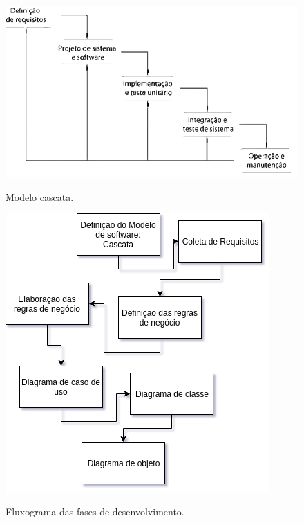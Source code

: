        \begin{figure}[H]
        	\centering
        	\caption{Modelo cascata.}	
        	\includegraphics[width=\linewidth, frame]{Imagens/cascata}
        	\label{fig:cascata}
        \end{figure}
        
        \begin{figure}[H]
        	\centering
        	\caption{Fluxograma das fases de desenvolvimento.}	
        	\includegraphics[width=\linewidth, frame]{Imagens/fluxograma.png}
        	\label{fig:flux}
        \end{figure}


